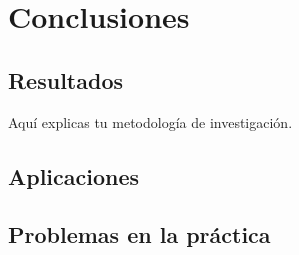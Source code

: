 \chapter{Conclusiones}
\section{Resultados}
Aquí explicas tu metodología de investigación.

\section{Aplicaciones}

\section{Problemas en la práctica}